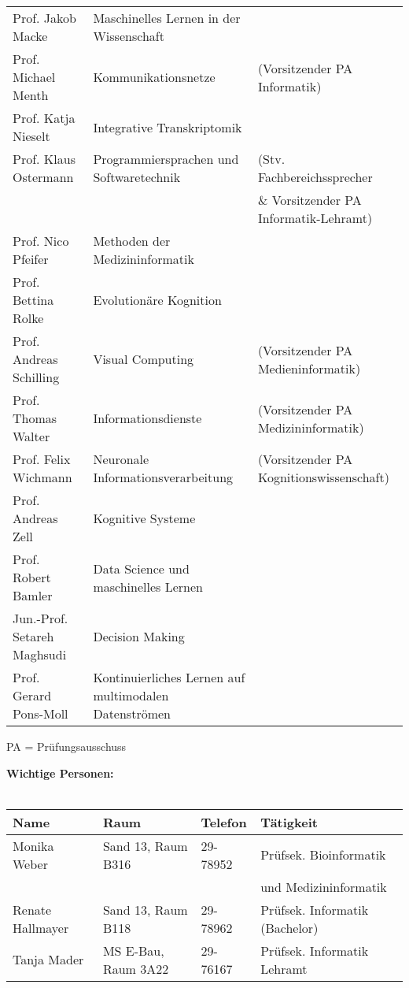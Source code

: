 \begin{tabular}{|lll|}
Prof. Jakob Macke         		& Maschinelles Lernen in der Wissenschaft 			&\\
Prof. Michael Menth         		& Kommunikationsnetze 						& (Vorsitzender PA Informatik)\\
Prof. Katja Nieselt	     		& Integrative Transkriptomik	 				&\\
Prof. Klaus Ostermann	   		& Programmiersprachen und Softwaretechnik 			& (Stv. Fachbereichssprecher  \\
                             		&                                        			& \& Vorsitzender PA Informatik-Lehramt) \\
Prof. Nico Pfeifer			& Methoden der Medizininformatik 				&\\
Prof. Bettina Rolke 		  	& Evolutionäre Kognition 					&\\
Prof. Andreas Schilling     		& Visual Computing 						& (Vorsitzender PA Medieninformatik)\\
Prof. Thomas Walter          		& Informationsdienste			 			& (Vorsitzender PA Medizininformatik) \\
Prof. Felix Wichmann          	& Neuronale Informationsverarbeitung 				& (Vorsitzender PA Kognitionswissenschaft)	\\
Prof. Andreas Zell           		& Kognitive Systeme 		 				&\\
Prof. Robert Bamler			& Data Science und maschinelles Lernen			&\\
Jun.-Prof. Setareh Maghsudi 		& Decision Making						&\\
Prof. Gerard Pons-Moll			& Kontinuierliches Lernen auf multimodalen Datenströmen	&\\

\hline
\end{tabular}
\scriptsize{PA = Prüfungsausschuss}


\textbf{Wichtige Personen:}\\\\
\begin{tabular}{|llll|}
\hline
Name                  & Raum		       & Telefon    & Tätigkeit \hfill\\
\hline
\hline
Monika Weber          & Sand 13, Raum B316    & 29-78952   & Prüfsek. Bioinformatik\\
                      &                       &            & und Medizininformatik \\
Renate Hallmayer      & Sand 13, Raum B118    & 29-78962   & Prüfsek. Informatik (Bachelor) \\
Tanja Mader      & MS E-Bau, Raum 3A22    & 29-76167   & Prüfsek. Informatik Lehramt \\
\hline
\end{tabular} \\

